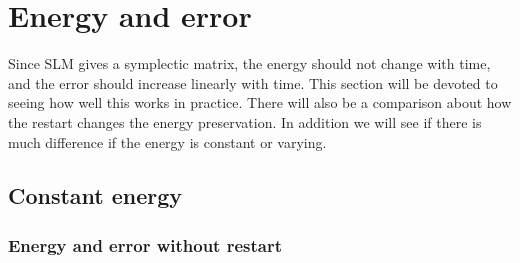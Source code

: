 \section{Energy and error }%

Since SLM gives a symplectic matrix, the energy should not change with time, and the error should increase linearly with time. This section will be devoted to seeing how well this works in practice. There will also be a comparison about how the restart changes the energy preservation. In addition we will see if there is much difference if the energy is constant or varying.

\subsection{Constant energy} %

\subsubsection{Energy and error without restart} %

